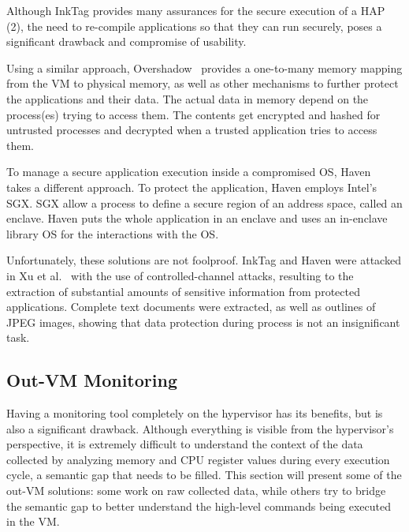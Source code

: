 \par Although InkTag provides many assurances for the secure execution of a \ac{HAP (2)}, the need to re-compile applications so that they can run securely, poses a significant drawback and compromise of usability.

\par Using a similar approach, Overshadow~\cite{chen2008overshadow} provides a one-to-many memory mapping from the \ac{VM} to physical memory, as well as other mechanisms to further protect the applications and their data. The actual data in memory depend on the process(es) trying to access them. The contents get encrypted and hashed for untrusted processes and decrypted when a trusted application tries to access them. 

\par To manage a secure application execution inside a compromised \ac{OS}, Haven~\cite{baumann2015shielding} takes a different approach. To protect the application, Haven employs Intel's \ac{SGX}. \ac{SGX} allow a process to define a secure region of an address space, called an enclave. Haven puts the whole application in an enclave and uses an in-enclave library \ac{OS} for the interactions with the \ac{OS}.

\par Unfortunately, these solutions are not foolproof. InkTag and Haven were attacked in Xu et al.~\cite{xu2015controlled} with the use of controlled-channel attacks, resulting to the extraction of substantial amounts of sensitive information from protected applications. Complete text documents were extracted, as well as outlines of JPEG images, showing that data protection during process is not an insignificant task. 


\subsection{Out-\ac{VM} Monitoring}\label{sub:outvm}
Having a monitoring tool completely on the hypervisor has its benefits, but is also a significant drawback. Although everything is visible from the hypervisor's perspective, it is extremely difficult to understand the context of the data collected by analyzing memory and \ac{CPU} register values during every execution cycle, a semantic gap that needs to be filled. This section will present some of the out-\ac{VM} solutions: some work on raw collected data, while others try to bridge the semantic gap to better understand the high-level commands being executed in the \ac{VM}.

